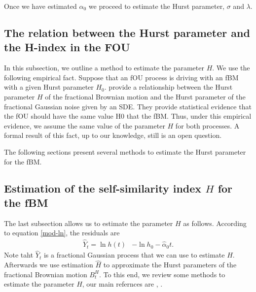 \documentclass[smallextended]{svjour3}
\begin{document}
    Once we have estimated $\alpha_0$ we proceed to estimate the Hurst 
    parameter, $\sigma$ and $\lambda$.

    \subsection{The relation between the Hurst 
        parameter and the H-index in the FOU}

        In this subsection, we outline a method to estimate the parameter $H$. 
    We use the following empirical fact. Suppose that an fOU process is driving 
    with an fBM with a given Hurst parameter $H_0$. 
    \citet{ye-etal}  provide a relationship between the Hurst parameter $H$ of 
    the fractional Brownian motion and the Hurst parameter of the fractional 
    Gaussian noise given by an SDE. They provide statistical evidence that the 
    fOU should have the same value H0 that the fBM. Thus, under this empirical 
    evidence, we assume the same value of the parameter $H$ for both 
    processes.  A formal result of this fact, up to our knowledge, still is an 
    open question.

        The following sections present several methods to estimate the Hurst 
    parameter for the fBM.


    \subsection{Estimation of the self-similarity index $H$ for the fBM}
    \label{Desc-Est-H}

        The last subsection allows us to estimate the parameter $H$ as follows.
    According to equation \eqref{mod-ln}, the residuals are 
    \begin{align*}
        \hat Y_t= \ln h(t) &
            -\ln h_0 -\widehat \alpha_0 t.
    \end{align*}
        Note taht $\hat Y_t$ is a fractional Gaussian process that we can use 
    to estimate $H$. Afterwards we use estimation $\hat H$ to approximate
    the Hurst parameters of the fractional Brownian motion $B_t^H$.
    To this end, we review some methods to estimate
    the parameter $H$, our main refernces are \cite{we}, .
\end{document}
